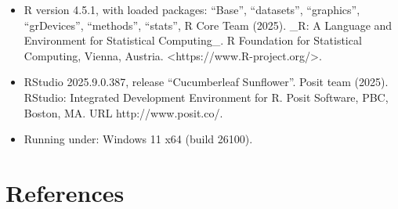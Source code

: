 \documentclass[
  a4paper,
]{article}
\providecommand{\tightlist}{%
  \setlength{\itemsep}{0pt}\setlength{\parskip}{0pt}}\usepackage{longtable,booktabs,array}
\begin{document}
\begin{itemize}
\tightlist
\item
  R version 4.5.1, with loaded packages: ``Base'', ``datasets'',
  ``graphics'', ``grDevices'', ``methods'', ``stats'', R Core Team
  (2025). \_R: A Language and Environment for Statistical Computing\_. R
  Foundation for Statistical Computing, Vienna, Austria.
  \textless https://www.R-project.org/\textgreater.
\item
  RStudio 2025.9.0.387, release ``Cucumberleaf Sunflower''. Posit team
  (2025). RStudio: Integrated Development Environment for R. Posit
  Software, PBC, Boston, MA. URL http://www.posit.co/.
\item
  Running under: Windows 11 x64 (build 26100).
\end{itemize}

\section*{References}\label{references}
\end{document}
